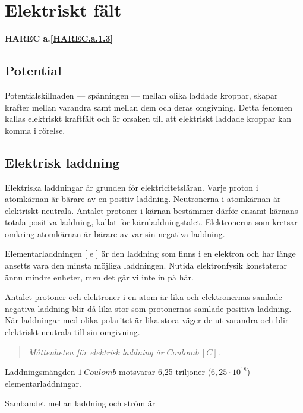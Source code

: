 \section{Elektriskt fält}
\textbf{HAREC a.\ref{HAREC.a.1.3}\label{myHAREC.a.1.3}}
\label{elektriskafält}

\subsection{Potential}

Potentialskillnaden --- spänningen --- mellan olika laddade kroppar, skapar krafter
mellan varandra samt mellan dem och deras omgivning. Detta fenomen kallas
elektriskt kraftfält och är orsaken till att elektriskt laddade kroppar kan
komma i rörelse.

\subsection{Elektrisk laddning}

Elektriska laddningar är grunden för elektricitetsläran. Varje proton i
atomkärnan är bärare av en positiv laddning. Neutronerna i atomkärnan är
elektriskt neutrala. Antalet protoner i kärnan bestämmer därför ensamt kärnans
totala positiva laddning, kallat för kärnladdningstalet. Elektronerna som
kretsar omkring atomkärnan är bärare av var sin negativa laddning.

Elementarladdningen [ e ] är den laddning som finns i en elektron och har länge
ansetts vara den minsta möjliga laddningen. Nutida elektronfysik konstaterar
ännu mindre enheter, men det går vi inte in på här.

Antalet protoner och elektroner i en atom är lika och elektronernas samlade
negativa laddning blir då lika stor som protonernas samlade positiva laddning.
När laddningar med olika polaritet är lika stora väger de ut varandra och blir
elektriskt neutrala till sin omgivning.

\begin{quote}\emph{
Måttenheten för elektrisk laddning är \(Coulomb\ [C]\).
}\end{quote}

Laddningsmängden \(1\ Coulomb\) motsvarar 6,25 triljoner (\(6,25\cdot10^{18}\))
elementarladdningar.

Sambandet mellan laddning och ström är

